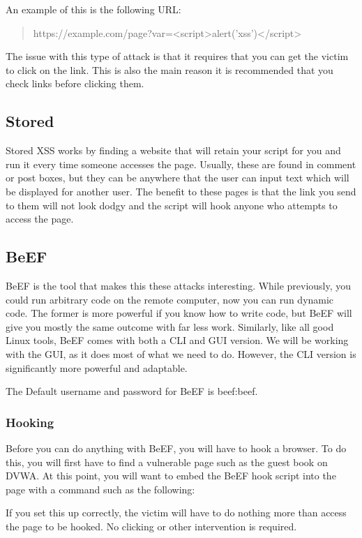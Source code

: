 			An example of this is the following URL:
			\begin{quote}
				https://example.com/page?var=<script>alert('xss')</script>
			\end{quote}

			The issue with this type of attack is that it requires that you can get the victim to click on the link.
			This is also the main reason it is recommended that you check links before clicking them.
		\subsection{Stored}
			Stored XSS works by finding a website that will retain your script for you and run it every time someone accesses the page.
			Usually, these are found in comment or post boxes, but they can be anywhere that the user can input text which will be displayed for another user.
			The benefit to these pages is that the link you send to them will not look dodgy and the script will hook anyone who attempts to access the page.
		\subsection{BeEF}
			BeEF is the tool that makes this these attacks interesting.
			While previously, you could run arbitrary code on the remote computer, now you can run dynamic code.
			The former is more powerful if you know how to write code, but BeEF will give you mostly the same outcome with far less work.
			Similarly, like all good Linux tools, BeEF comes with both a CLI and GUI version.
			We will be working with the GUI, as it does most of what we need to do.
			However, the CLI version is significantly more powerful and adaptable.

			The Default username and password for BeEF is beef:beef.
			\subsubsection{Hooking}
				Before you can do anything with BeEF, you will have to hook a browser.
				To do this, you will first have to find a vulnerable page such as the guest book on DVWA.
				At this point, you will want to embed the BeEF hook script into the page with a command such as the following:
				
				If you set this up correctly, the victim will have to do nothing more than access the page to be hooked.
				No clicking or other intervention is required.
